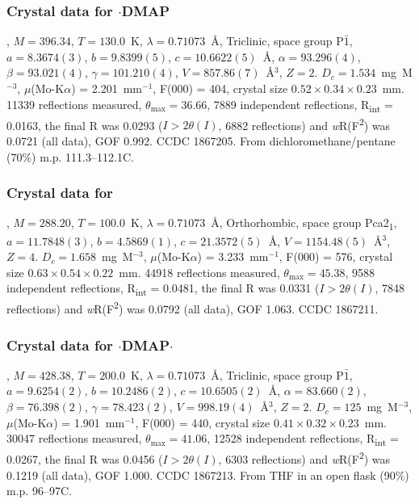 \begin{refsection}
\subsubsection{Crystal data for \texorpdfstring{$\cdot$DMAP}{C20H19N3OSe}}
, $M=396.34$, $T=130.0$~K, $\lambda=0.71073$~\AA, Triclinic, space group P$\bar{1}$, $a = 8.3674(3)$, $b = 9.8399(5)$, $c =10.6622(5)$~\AA, $\alpha=93.296(4)$\degree, $\beta=93.021(4)$\degree, $\gamma=101.210(4)$\degree, $V=857.86(7)$~\AA$^{3}$, $Z = 2$.
$D_{c}= 1.534$~mg~M$^{-3}$, $\mu$(Mo-K$\alpha$) = 2.201~mm$^{-1}$, F(000) = 404, crystal size $0.52 \times 0.34 \times 0.23$~mm.
11339 reflections measured, $\theta_{\mathrm{max}}=36.66$\degree, 7889 independent reflections, R\textsubscript{int} = 0.0163, the final R was 0.0293 ($I > 2\theta(I)$, 6882 reflections) and \emph{w}R(F\textsuperscript{2}) was 0.0721 (all data), GOF 0.992.
CCDC 1867205.
From dichloromethane/pentane (70\%) m.p. 111.3--112.1\degree C.

\subsubsection{Crystal data for \texorpdfstring{}{C14H11NOSe}}
, $M=288.20$, $T=100.0$~K, $\lambda=0.71073$~\AA, Orthorhombic, space group Pca2\textsubscript{1}, $a = 11.7848(3)$, $b = 4.5869(1)$, $c = 21.3572(5)$~\AA, $V = 1154.48(5)$~\AA$^{3}$, $Z = 4$.
$D_{c}= 1.658$~mg~M$^{-3}$, $\mu$(Mo-K$\alpha$) = 3.233~mm$^{-1}$, F(000) = 576, crystal size $0.63 \times 0.54 \times 0.22$~mm.
44918 reflections measured, $\theta_{\mathrm{max}}=45.38$\degree, 9588 independent reflections, R\textsubscript{int} = 0.0481, the final R was 0.0331 ($I > 2\theta(I)$, 7848 reflections) and \emph{w}R(F\textsuperscript{2}) was 0.0792 (all data), GOF 1.063.
CCDC 1867211.

\subsubsection{Crystal data for \texorpdfstring{$\cdot$DMAP$\cdot$}{C21H21N3OSe.(H2O)}}
, $M=428.38$, $T=200.0$~K, $\lambda=0.71073$~\AA, Triclinic, space group P$\bar{1}$, $a = 9.6254(2)$, $b = 10.2486(2)$, $c = 10.6505(2)$~\AA, $\alpha = 83.660(2)$\degree, $\beta = 76.398(2)$\degree, $\gamma = 78.423(2)$\degree, $V = 998.19(4)$~\AA$^{3}$, $Z = 2$.
$D_{c}= 125$~mg~M$^{-3}$, $\mu$(Mo-K$\alpha$) = 1.901~mm$^{-1}$, F(000) = 440, crystal size $0.41 \times 0.32 \times 0.23$~mm.
30047 reflections measured, $\theta_{\mathrm{max}} = 41.06$\degree, 12528 independent reflections, R\textsubscript{int} = 0.0267, the final R was 0.0456 ($I > 2\theta(I)$, 6303 reflections) and \emph{w}R(F\textsuperscript{2}) was 0.1219 (all data), GOF 1.000.
CCDC 1867213.
From THF in an open flask (90\%) m.p. 96--97\degree C.


\end{refsection}
